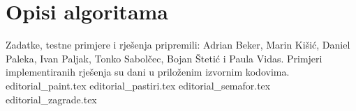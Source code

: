 \documentclass[a4paper]{article}
\date{July 17th 2020.}
\begin{document}
\section*{Opisi algoritama}
Zadatke, testne primjere i rješenja pripremili: Adrian Beker, Marin Kišić,
Daniel Paleka, Ivan Paljak, Tonko Sabolčec, Bojan Štetić i Paula Vidas.
Primjeri implementiranih rješenja su dani u priloženim izvornim kodovima.
{editorial_paint.tex}
\clearpage
{editorial_pastiri.tex}
\clearpage
{editorial_semafor.tex}
\clearpage
{editorial_zagrade.tex}
\clearpage
\end{document}
